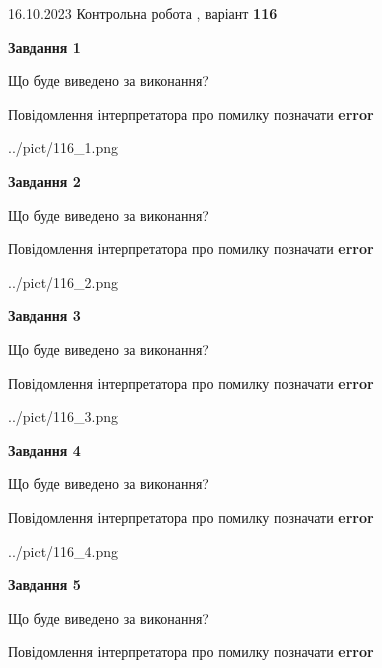 \documentclass[12pt, ukrainian]{article}
\begin{document}
{\Large{16.10.2023 Контрольна робота , варіант  \No \textbf { 116 }\par}}
{
\begin {large}
{\begin {center}\textbf{Завдання 1}\end {center}}\par
Що буде виведено за виконання? \par
Повідомлення інтерпретатора про помилку позначати \textbf{error}

\begin{center}
	{../pict/116_1.png}
\end{center}
\newpage

{\begin {center}\textbf{Завдання 2}\end {center}}\par
Що буде виведено за виконання? \par
Повідомлення інтерпретатора про помилку позначати \textbf{error}

\begin{center}
	{../pict/116_2.png}
\end{center}
\newpage

{\begin {center}\textbf{Завдання 3}\end {center}}\par
Що буде виведено за виконання? \par
Повідомлення інтерпретатора про помилку позначати \textbf{error}

\begin{center}
	{../pict/116_3.png}
\end{center}
\newpage

{\begin {center}\textbf{Завдання 4}\end {center}}\par
Що буде виведено за виконання? \par
Повідомлення інтерпретатора про помилку позначати \textbf{error}

\begin{center}
	{../pict/116_4.png}
\end{center}
\newpage

{\begin {center}\textbf{Завдання 5}\end {center}}\par
Що буде виведено за виконання? \par
Повідомлення інтерпретатора про помилку позначати \textbf{error}


\end{large}}
\end{document}
